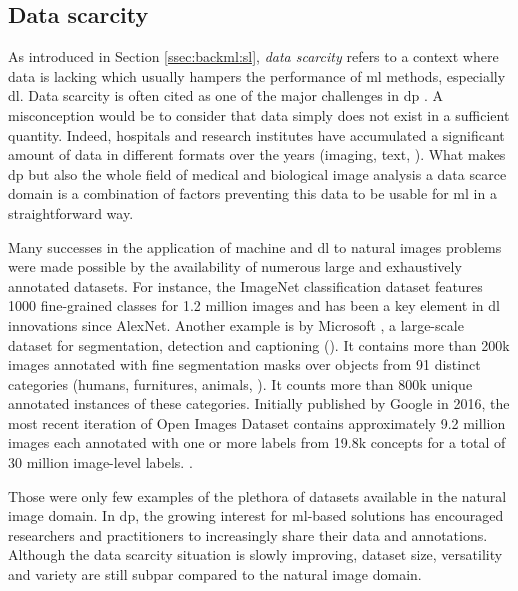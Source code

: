 \subsection{Data scarcity}
\label{ssec:backdp:datascarcity}

As introduced in Section \ref{ssec:backml:sl}, \textit{data scarcity} refers to a context where data is lacking which usually hampers the performance of \acrlong{ml} methods, especially \acrlong{dl}. Data scarcity is often cited as one of the major challenges in \acrlong{dp} \parencite{tizhoosh2018artificial,litjens2017survey,robertson2018digital,komura2018machine}. A misconception would be to consider that data simply does not exist in a sufficient quantity. Indeed, hospitals and research institutes have accumulated a significant amount of data in different formats over the years (\eg imaging, text, \etc). What makes \acrlong{dp} but also the whole field of medical and biological image analysis a data scarce domain is a combination of factors preventing this data to be usable for \acrlong{ml} in a straightforward way.

Many successes in the application of machine and \acrlong{dl} to natural images problems were made possible by the availability of numerous large and exhaustively annotated datasets. For instance, the ImageNet classification dataset features 1000 fine-grained classes for 1.2 million images and has been a key element in \acrlong{dl} innovations since AlexNet. Another example is  by Microsoft \parencite{lin2014microsoft}, a large-scale dataset for segmentation, detection and captioning (). It contains more than 200k images annotated with fine segmentation masks over objects from 91 distinct categories (\ie humans, furnitures, animals, \etc). It counts more than 800k unique annotated instances of these categories. Initially published by Google in 2016, the most recent iteration of Open Images Dataset \parencite{kuznetsova2020open} contains approximately 9.2 million images each annotated with one or more labels from 19.8k concepts for a total of 30 million image-level labels. . 

Those were only few examples of the plethora of datasets available in the natural image domain. In \acrlong{dp}, the growing interest for \acrshort{ml}-based solutions has encouraged researchers and practitioners to increasingly share their data and annotations. Although the data scarcity situation is slowly improving, dataset size, versatility and variety are still subpar compared to the natural image domain.


